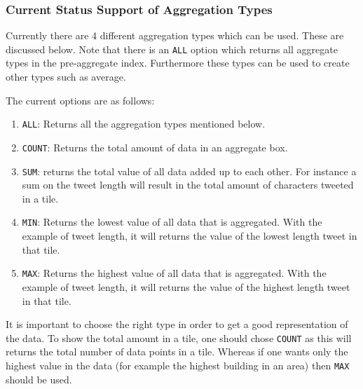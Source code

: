 \subsubsection{Current Status Support of Aggregation Types}
Currently there are 4 different aggregation types which can be used. These are discussed below. Note that there is an \lstinline|ALL| option which returns all aggregate types in the pre-aggregate index. Furthermore these types can be used to create other types such as average.

The current options are as follows:
\begin{enumerate}
\item \lstinline|ALL|: 	Returns all the aggregation types mentioned below.
\item \lstinline|COUNT|: Returns the total amount of data in an aggregate box.
\item \lstinline|SUM|: returns the total value of all data added up to each other. For instance a sum on the tweet length will result in the total amount of characters tweeted in a tile.
\item \lstinline|MIN|: Returns the lowest value of all data that is aggregated. With the example of tweet length, it will returns the value of the lowest length tweet in that tile.
\item \lstinline|MAX|: Returns the highest value of all data that is aggregated. With the example of tweet length, it will returns the value of the highest length tweet in that tile.
\end{enumerate}

It is important to choose the right type in order to get a good representation of the data. To show the total amount in a tile, one should chose \lstinline|COUNT| as this will returns the total number of data points in a tile. Whereas if one wants only the highest value in the data (for example the highest building in an area) then \lstinline|MAX| should be used.
